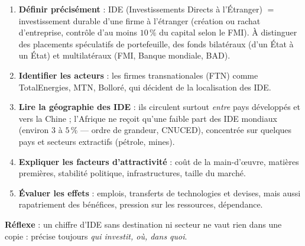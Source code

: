 \documentclass[11pt]{article}
\begin{document}
\begin{methode}
\begin{enumerate}
\item \textbf{Définir précisément} : IDE (Investissements Directs à l'Étranger) $=$ investissement durable d'une firme à l'étranger (création ou rachat d'entreprise, contrôle d'au moins $10\,\%$ du capital selon le FMI). À distinguer des placements spéculatifs de portefeuille, des fonds bilatéraux (d'un État à un État) et multilatéraux (FMI, Banque mondiale, BAD).
\item \textbf{Identifier les acteurs} : les firmes transnationales (FTN) comme TotalEnergies, MTN, Bolloré, qui décident de la localisation des IDE.
\item \textbf{Lire la géographie des IDE} : ils circulent surtout \emph{entre} pays développés et vers la Chine ; l'Afrique ne reçoit qu'une faible part des IDE mondiaux (environ $3$ à $5\,\%$ — ordre de grandeur, CNUCED), concentrée sur quelques pays et secteurs extractifs (pétrole, mines).
\item \textbf{Expliquer les facteurs d'attractivité} : coût de la main-d'œuvre, matières premières, stabilité politique, infrastructures, taille du marché.
\item \textbf{Évaluer les effets} : emplois, transferts de technologies et devises, mais aussi rapatriement des bénéfices, pression sur les ressources, dépendance.
\end{enumerate}
\textbf{Réflexe} : un chiffre d'IDE sans destination ni secteur ne vaut rien dans une copie : précise toujours \emph{qui investit, où, dans quoi}.
\end{methode}
\end{document}
